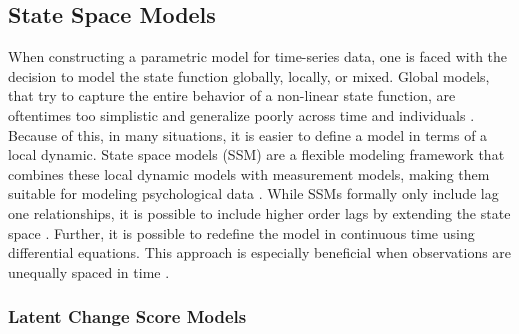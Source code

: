 
\subsection{State Space Models}

When constructing a parametric model for time-series data, one is faced with
the
decision to model the state function globally, locally, or mixed. Global
models,
that try to capture the entire behavior of a non-linear state function, are
oftentimes too simplistic and generalize poorly across time and individuals
\parencite{hunter_two_2022}. Because of this, in many situations, it is easier
to
define a model in terms of a local dynamic. State space models (SSM) are a
flexible modeling framework that combines these local dynamic models with
measurement models, making them suitable for modeling psychological data
\parencite{durbin_time_2012}. While SSMs formally only include lag one
relationships,
it is possible to include higher order lags by extending the
state space \parencite{hunter_state_2018}. Further, it is possible
to redefine the model in continuous time using differential equations. This
approach is
especially beneficial when observations are unequally spaced in time
\parencite{van_montfort_continuous_2018}.

\subsubsection{Latent Change Score Models}

